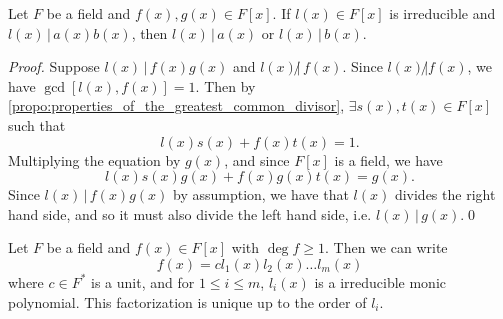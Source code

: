\begin{propo}
\label{propo:euclid_s_lemma_for_polynomials}
Let $F$ be a field and $f(x), g(x) \in F[x]$. If $l(x) \in F[x]$ is irreducible and $l(x) \, | \, a(x) b(x)$, then $l(x) \, | \, a(x)$ or $l(x) \, | \, b(x)$.
\end{propo}

\begin{proof}
  Suppose $l(x) \, | \, f(x) g(x)$ and $l(x) \not| \, f(x)$. Since $l(x) \not| f(x)$, we have $\gcd[ l(x), f(x) ] = 1$. Then by \cref{propo:properties_of_the_greatest_common_divisor}, $\exists s(x), t(x) \in F[x]$ such that
  \begin{equation*}
    l(x) s(x) + f(x) t(x) = 1.
  \end{equation*}
  Multiplying the equation by $g(x)$, and since $F[x]$ is a field, we have
  \begin{equation*}
    l(x) s(x) g(x) + f(x) g(x) t(x) = g(x).
  \end{equation*}
  Since $l(x) \, | \, f(x) g(x)$ by assumption, we have that $l(x)$ divides the right hand side, and so it must also divide the left hand side, i.e. $l(x) \, | \, g(x)$.\qed
\end{proof}

\begin{thm}
\label{thm:unique_factorization_theorem_for_polynomials}
Let $F$ be a field and $f(x) \in F[x]$ with $\deg f \geq 1$. Then we can write
\begin{equation*}
  f(x) = c l_1(x) l_2(x) \hdots l_m(x)
\end{equation*}
where $c \in F^*$ is a unit, and for $1 \leq i \leq m$, $l_i(x)$ is a irreducible monic polynomial. This factorization is unique up to the order of $l_i$.
\end{thm}

